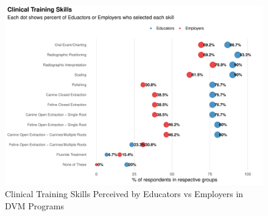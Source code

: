 \documentclass[
  11pt,
  letterpaper,
  DIV=11,
  numbers=noendperiod]{scrartcl}
\numberwithin{figure}{section}
\begin{document}
\begin{figure}[H]

{\centering \includegraphics{Final-Project_files/figure-pdf/question_7a-1.pdf}

}

\caption{Clinical Training Skills Perceived by Educators vs Employers in
DVM Programs}

\end{figure}
\end{document}
